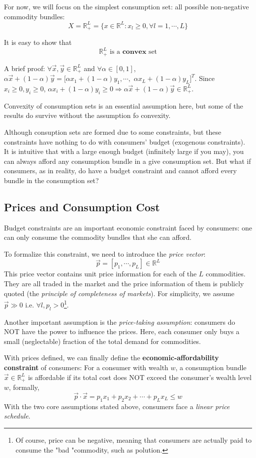 For now, we will focus on the simplest consumption set: all possible non-negative commodity bundles:
$$X=\mathbb{R}^L_+=\{x\in \mathbb{R}^L: x_l\geq 0,\forall l=1,\cdots, L\}$$

It is easy to show that
$$\mathbb{R}^L_+ \text{ is a }\textbf{convex} \text{ set}$$

A brief proof: $\forall \vec{x},\vec{y}\in \mathbb{R}^L_+$ and $\forall\alpha \in [0,1]$, $\alpha\vec{x}+(1-\alpha)\vec{y}=[\alpha x_1+(1-\alpha)y_1,\cdots,$ $\alpha x_L+(1-\alpha)y_L]^T$. Since $x_i\geq 0,y_i\geq 0$, $\alpha x_i+(1-\alpha)y_i\geq 0 \Rightarrow\alpha\vec{x}+(1-\alpha)\vec{y}\in \mathbb{R}^L_+$.

Convexity of consumption sets is an essential assumption here, but some of the results do survive without the assumption fo convexity.

Although consuption sets are formed due to some constraints, but these constraints have nothing to do with consumers' budget (exogenous constraints). It is intuitive that with a large enough budget (infinitely large if you may), you can always afford any consumption bundle in a give consumption set. But what if consumers, as in reality, do have a budget constraint and cannot afford every bundle in the consumption set?

\subsection{Prices and Consumption Cost}\label{chap2:sec1:ssec3}
Budget constraints are an important economic constraint faced by consumers: one can only consume the commodity bundles that she can afford.

To formalize this constraint, we need to introduce the \textit{price vector}: 
$$\vec{p}=\left[p_1,\cdots,p_L\right]\in \mathbb{R}^L$$
This price vector contains unit price information for each of the $L$ commodities. They are all traded in the market and the price information of them is publicly quoted (the \textit{principle of completeness of markets}).
For simplicity, we assume $\vec{p}\gg 0$ i.e. $\forall l,p_l>0$\footnote{Of course, price can be negative, meaning that consumers are actually paid to consume the "bad "commodity, such as polution.}.

Another important assumption is the \textit{price-taking assumption}: consumers do NOT have the power to influence the prices. Here, each consumer only buys a small (neglectable) fraction of the total demand for commodities.

With prices defined, we can finally define the \textbf{economic-affordability constraint} of consumers: For a consumer with wealth $w$, a consumption bundle $\vec{x}\in \mathbb{R}^L_+$ is affordable if its total cost does NOT exceed the consumer's wealth level $w$, formally, $$\vec{p}\cdot \vec{x}=p_1x_1+p_2x_2+\cdots+p_Lx_L\leq w$$
With the two core assumptions stated above, consumers face a \textit{linear price schedule}.